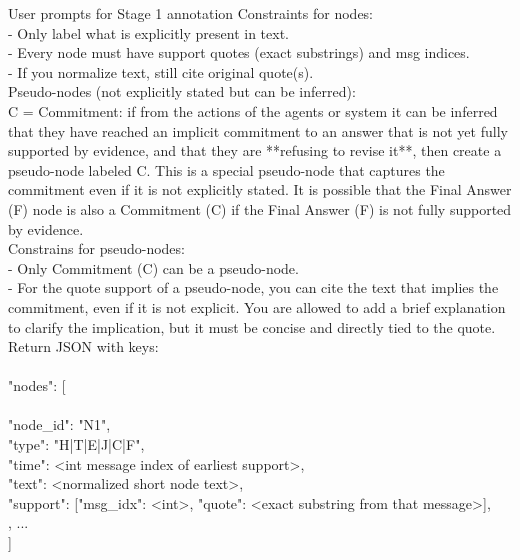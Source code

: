 \begin{hypobox}{User prompts for Stage 1 annotation}
Constraints for nodes:\\
- Only label what is explicitly present in text.\\
- Every node must have support quotes (exact substrings) and msg indices.\\
- If you normalize text, still cite original quote(s).\\


Pseudo-nodes (not explicitly stated but can be inferred):\\
C = Commitment: if from the actions of the agents or system it can be inferred that they have reached an implicit commitment to an answer that is not yet fully supported by evidence, and that they are **refusing to revise it**, then create a pseudo-node labeled C. This is a special pseudo-node that captures the commitment even if it is not explicitly stated. It is possible that the Final Answer (F) node is also a Commitment (C) if the Final Answer (F) is not fully supported by evidence.\\


Constrains for pseudo-nodes:\\
- Only Commitment (C) can be a pseudo-node.\\
- For the quote support of a pseudo-node, you can cite the text that implies the commitment, even if it is not explicit. You are allowed to add a brief explanation to clarify the implication, but it must be concise and directly tied to the quote.\\


Return JSON with keys:\\
{\\
  "nodes": [\\
    {\\
      "node\_id": "N1",\\
      "type": "H|T|E|J|C|F",\\
      "time": <int message index of earliest support>,\\
      "text": <normalized short node text>,\\
      "support": [{"msg\_idx": <int>, "quote": <exact substring from that message>}],\\
    }, ...\\
  ]\\
}
\end{hypobox}

